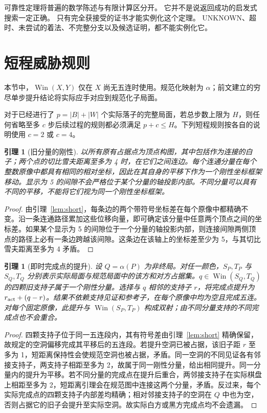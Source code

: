 \documentclass[11pt]{article}
\newtheorem{lemma}[theorem]{引理}
\theoremstyle{definition}
\theoremstyle{remark}
\newcommand{\A}{\alpha}
\newcommand{\Win}{\operatorname{Win}}
\begin{document}
可靠性定理将普遍的数学陈述与有限计算区分开。
它并不是说返回成功的启发式搜索一定正确。
只有完全获接受的证书才能实例化这个定理。
UNKNOWN、超时、未尝试的着法、不完整分支以及候选证明，都不能实例化它。

\section{短程威胁规则}\label{sec:short}
本节中，$\Win(X,Y)$ 仅在 $X$ 尚无五连时使用。规范化映射为 $\A$；前文建立的穷尽单步提升结论将实际应手对应到规范化子局面。

对于已经进行了 $p=|B|+|W|$ 个实际落子的完整局面，若总步数上限为 $H$，则任何省略至多 $c$ 步后续过程的规则都必须满足 $p+c\le H$。下列短程规则按各自的说明使用 $c=2$ 或 $c=4$。

\begin{lemma}[旧分量的刚性]\label{mac:rigid-frame}
以所有原有占据点为顶点构图，其中包括作为连接的白子；两个点的切比雪夫距离至多为 4 时，在它们之间连边。每个连通分量在每个整数原像中都具有相同的相对坐标，因此在其自身的平移下作为一个刚性坐标框架移动。显示为 5 的间隙不会严格位于某个分量的轴投影内部。不同分量可以具有不同的平移，不能将它们视为同一个刚性坐标框架。
\end{lemma}
\begin{proof}
由引理~\ref{lem:short}，每条边的两个带符号坐标差在每个原像中都精确不变。沿一条连通路径累加这些位移向量，即可确定该分量中任意两个顶点之间的坐标差。如果某个显示为 5 的间隙位于一个分量的轴投影内部，则连接间隙两侧顶点的路径上必有一条边跨越该间隙。这条边在该轴上的坐标差至少为 5，与其切比雪夫距离至多为 4 矛盾。
\end{proof}

\begin{lemma}[即时完成点的提升]\label{mac:completion-lift}
设 $Q=\A(P)$ 为非终局。对任一颜色，$S_P,T_P$ 与 $S_Q,T_Q$ 分别表示实际局面与规范局面中的该方和对方占据集。$q\in\Win(S_Q,T_Q)$ 的四颗旧支持子属于一个刚性分量。选择与 $q$ 相邻的支持子 $r$，将完成点提升为 $r_{\rm act}+(q-r)$。结果不依赖支持见证和参考子，在每个原像中均为空且完成五连。对每个固定原像，此提升与 $\Win(S_P,T_P)$ 构成双射；由不同分量支持的不同完成点也不会重合。
\end{lemma}
\begin{proof}
四颗支持子位于同一五连段内，其有符号差由引理~\ref{lem:short} 精确保留，故规定的空洞偏移完成其平移后的五连段。若提升空洞已被占据，该旧子距 $r$ 至多为 1，短距离保持性会使规范空洞也被占据，矛盾。同一空洞的不同见证各有邻接支持子，两支持子相距至多为 2，故属于同一刚性分量，给出相同提升。同一分量内的提升为平移。若不同分量的完成点在提升后重合，两邻接支持子在实际棋盘上相距至多为 2，短距离引理会在规范图中连接这两个分量，矛盾。反过来，每个实际完成点的四颗支持子内部差均精确；相对邻接支持子的空洞在 $Q$ 中也为空，否则占据它的旧子会提升至实际空洞。故实际白方或黑方完成点均不会遗漏。
\end{proof}
\end{document}
